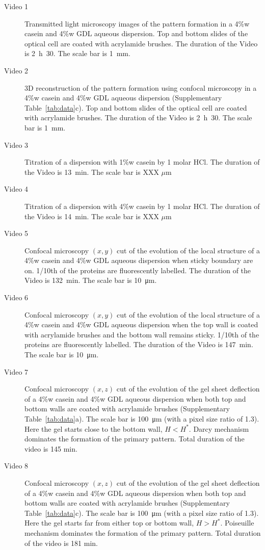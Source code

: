 \documentclass[twocolumn,superscriptaddress,showpacs,preprintnumbers,
amsmath,amssymb,prl]{revtex4-1}
\begin{document}
\begin{description}
\item[Video 1] Transmitted light microscopy images of the pattern formation in a 4\%w casein and 4\%w GDL aqueous dispersion. Top and bottom slides of the optical cell are coated with acrylamide brushes. The duration of the Video is 2~h~30. The scale bar is \SI{1}{\milli\metre}.

\item[Video 2] 3D reconstruction of the pattern formation using confocal microscopy in a 4\%w casein and 4\%w GDL aqueous dispersion (Supplementary Table~\ref{tab:data}c). Top and bottom slides of the optical cell are coated with acrylamide brushes. The duration of the Video is 2~h~30. The scale bar is \SI{1}{\milli\metre}.


\item[Video 3] Titration of a dispersion with 1\%w casein by 1 molar HCl. The duration of the Video is \SI{13}{\minute}. The scale bar is XXX $\mu$m


\item[Video 4] Titration of a dispersion with 4\%w casein by 1 molar HCl. The duration of the Video is \SI{14}{\minute}. The scale bar is XXX $\mu$m


\item[Video 5] Confocal microscopy $(x,y)$ cut of the evolution of the local structure of a 4\%w casein and 4\%w GDL aqueous dispersion when sticky boundary are on. 1/10th of the proteins are fluorescently labelled. The duration of the Video is \SI{132}{\minute}. The scale bar is \SI{10}{\micro\metre}.

\item[Video 6] Confocal microscopy $(x,y)$ cut of the evolution of the local structure of a 4\%w casein and 4\%w GDL aqueous dispersion when the top wall is coated with acrylamide brushes and the bottom wall remains sticky. 1/10th of the proteins are fluorescently labelled. The duration of the Video is \SI{147}{\minute}. The scale bar is \SI{10}{\micro\metre}.

\item[Video 7] Confocal microscopy $(x,z)$ cut of the evolution of the gel sheet deflection of a 4\%w casein and 4\%w GDL aqueous dispersion when both top and bottom walls are coated with acrylamide brushes (Supplementary Table~\ref{tab:data}a). The scale bar is \SI{100}{\micro\metre} (with a pixel size ratio of 1.3). Here the gel starts close to the bottom wall, $H<H^*$. Darcy mechanism dominates the formation of the primary pattern. Total duration of the video is 145 min.

\item[Video 8] Confocal microscopy $(x,z)$ cut of the evolution of the gel sheet deflection of a 4\%w casein and 4\%w GDL aqueous dispersion when both top and bottom walls are coated with acrylamide brushes (Supplementary Table~\ref{tab:data}c). The scale bar is \SI{100}{\micro\metre} (with a pixel size ratio of 1.3). Here the gel starts far from either top or bottom wall, $H>H^*$. Poiseuille mechanism dominates the formation of the primary pattern. Total duration of the video is 181 min.

\end{description}
\end{document}
